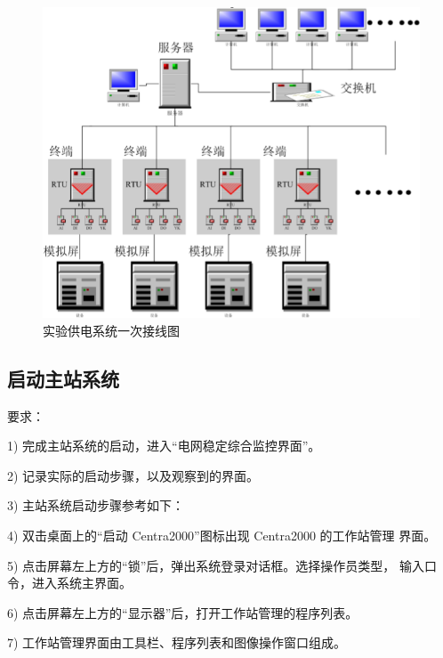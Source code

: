 \documentclass[a4paper]{ctexrep}
\begin{document}
                        \begin{figure}[htbp]
                            \centering
                            \includegraphics[width=12cm]{2.png}
                            \caption{实验供电系统一次接线图}
                        \end{figure}

                    \newpage

                    \subsection{启动主站系统}
                        要求：
                        
                        1) 完成主站系统的启动，进入“电网稳定综合监控界面”。 
                        
                        2) 记录实际的启动步骤，以及观察到的界面。
                        
                        3) 主站系统启动步骤参考如下： 
                        
                        4) 双击桌面上的“启动 Centra2000”图标出现 Centra2000 的工作站管理 界面。
                        
                        5) 点击屏幕左上方的“锁”后，弹出系统登录对话框。选择操作员类型， 输入口令，进入系统主界面。
                        
                        6) 点击屏幕左上方的“显示器”后，打开工作站管理的程序列表。 
                        
                        7) 工作站管理界面由工具栏、程序列表和图像操作窗口组成。 
                        
\end{document}
